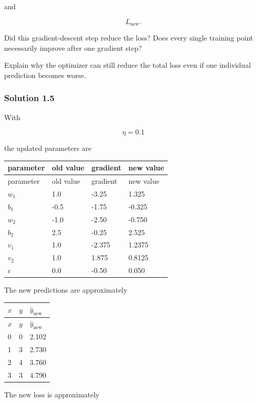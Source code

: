 \documentclass[10pt]{article}
\begin{document}
and

\[
L_{\mathrm{new}}.
\]

Did this gradient-descent step reduce the loss? Does every single training point necessarily improve after one gradient step?

Explain why the optimizer can still reduce the total loss even if one individual prediction becomes worse.

\begingroup\color{red}

\subsubsection*{Solution 1.5}
With

\[
\eta=0.1
\]

the updated parameters are

\begingroup
\small
\setlength{\tabcolsep}{4pt}
\begin{longtable}{l|l|l|l}
parameter & old value & gradient & new value \\[1.5pt]
\hline
\endfirsthead
parameter & old value & gradient & new value \\[1.5pt]
\hline
\endhead
$w_1$ & 1.0 & -3.25 & 1.325 \\[1.5pt]
$b_1$ & -0.5 & -1.75 & -0.325 \\[1.5pt]
$w_2$ & -1.0 & -2.50 & -0.750 \\[1.5pt]
$b_2$ & 2.5 & -0.25 & 2.525 \\[1.5pt]
$v_1$ & 1.0 & -2.375 & 1.2375 \\[1.5pt]
$v_2$ & 1.0 & 1.875 & 0.8125 \\[1.5pt]
$c$ & 0.0 & -0.50 & 0.050 \\[1.5pt]
\end{longtable}
\endgroup
The new predictions are approximately

\begingroup
\small
\setlength{\tabcolsep}{4pt}
\begin{longtable}{l|l|l}
$x$ & $y$ & $\hat y_{\mathrm{new}}$ \\[1.5pt]
\hline
\endfirsthead
$x$ & $y$ & $\hat y_{\mathrm{new}}$ \\[1.5pt]
\hline
\endhead
0 & 0 & 2.102 \\[1.5pt]
1 & 3 & 2.730 \\[1.5pt]
2 & 4 & 3.760 \\[1.5pt]
3 & 3 & 4.790 \\[1.5pt]
\end{longtable}
\endgroup
The new loss is approximately
\end{document}
